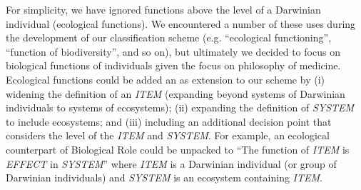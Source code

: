\documentclass{article}
\begin{document}
For simplicity, we have ignored functions above the level of a Darwinian individual (ecological functions).
We encountered a number of these uses during the development of our classification scheme (e.g. ``ecological functioning'', ``function of biodiversity'', and so on), but ultimately we decided to focus on biological functions of individuals given the focus on philosophy of medicine.
Ecological functions could be added an as extension to our scheme by (i) widening the definition of an \emph{ITEM} (expanding beyond systems of Darwinian individuals to systems of ecosystems); (ii) expanding the definition of \emph{SYSTEM} to include ecosystems; and (iii) including an additional decision point that considers the level of the \emph{ITEM} and \emph{SYSTEM}.
For example, an ecological counterpart of Biological Role could be unpacked to ``The function of \emph{ITEM} is \emph{EFFECT} in \emph{SYSTEM}'' where \emph{ITEM} is a Darwinian individual (or group of Darwinian individuals) and \emph{SYSTEM} is an ecosystem containing \emph{ITEM}.
\end{document}
